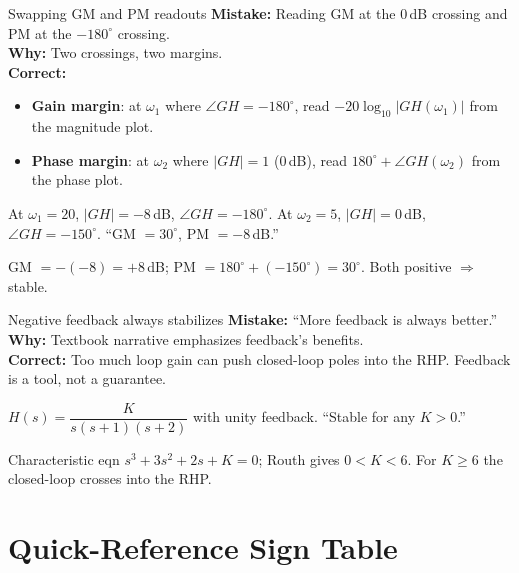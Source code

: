 \documentclass[11pt]{article}
\begin{document}
\begin{pitfallbox}{Swapping GM and PM readouts}
\textbf{Mistake:} Reading GM at the $0$\,dB crossing and PM at the $-180^\circ$ crossing.\\
\textbf{Why:} Two crossings, two margins.\\
\textbf{Correct:}
\begin{itemize}[leftmargin=1.5em,nosep]
\item \textbf{Gain margin}: at $\omega_1$ where $\angle GH = -180^\circ$, read $-20\log_{10}|GH(\omega_1)|$ from the magnitude plot.
\item \textbf{Phase margin}: at $\omega_2$ where $|GH| = 1$ ($0$\,dB), read $180^\circ + \angle GH(\omega_2)$ from the phase plot.
\end{itemize}
\begin{wrongbox}
At $\omega_1=20$, $|GH|=-8$\,dB, $\angle GH = -180^\circ$. At $\omega_2=5$, $|GH| = 0$\,dB, $\angle GH = -150^\circ$. ``GM $= 30^\circ$, PM $= -8$\,dB.''
\end{wrongbox}
\begin{rightbox}
GM $= -(-8) = +8$\,dB; PM $= 180^\circ + (-150^\circ) = 30^\circ$. Both positive $\Rightarrow$ stable.
\end{rightbox}
\end{pitfallbox}

\begin{pitfallbox}{Negative feedback always stabilizes}
\textbf{Mistake:} ``More feedback is always better.''\\
\textbf{Why:} Textbook narrative emphasizes feedback's benefits.\\
\textbf{Correct:} Too much loop gain can push closed-loop poles into the RHP. Feedback is a tool, not a guarantee.
\begin{wrongbox}
$H(s) = \dfrac{K}{s(s+1)(s+2)}$ with unity feedback. ``Stable for any $K>0$.''
\end{wrongbox}
\begin{rightbox}
Characteristic eqn $s^3 + 3s^2 + 2s + K = 0$; Routh gives $0 < K < 6$. For $K\ge 6$ the closed-loop crosses into the RHP.
\end{rightbox}
\end{pitfallbox}

\section*{Quick-Reference Sign Table}
\end{document}
